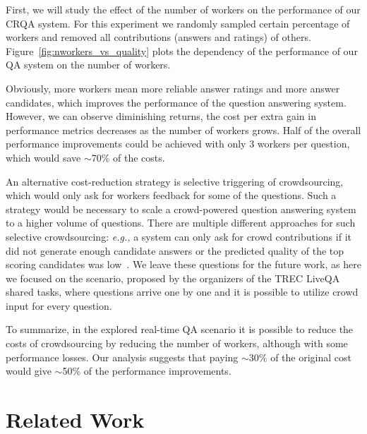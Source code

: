 \documentclass[letterpaper]{article}
\makeatletter
\newcommand{\eg}{\textit{e.g.,}\@\xspace}
\makeatother
\begin{document}
First, we will study the effect of the number of workers on the performance of our CRQA system.
For this experiment we randomly sampled certain percentage of workers and removed all contributions (answers and ratings) of others.
Figure~\ref{fig:nworkers_vs_quality} plots the dependency of the performance of our QA system on the number of workers.

Obviously, more workers mean more reliable answer ratings and more answer candidates, which improves the performance of the question answering system.
However, we can observe diminishing returns, the cost per extra gain in performance metrics decreases as the number of workers grows.
Half of the overall performance improvements could be achieved with only 3 workers per question, which would save $\sim$70\% of the costs.

An alternative cost-reduction strategy is selective triggering of crowdsourcing, which would only ask for workers feedback for some of the questions.
Such a strategy would be necessary to scale a crowd-powered question answering system to a higher volume of questions.
There are multiple different approaches for such selective crowdsourcing: \eg a system can only ask for crowd contributions if it did not generate enough candidate answers or the predicted quality of the top scoring candidates was low~\cite{carmel2010estimating,he2006query}.
We leave these questions for the future work, as here we focused on the scenario, proposed by the organizers of the TREC LiveQA shared tasks, where questions arrive one by one and it is possible to utilize crowd input for every question.

To summarize, in the explored real-time QA scenario it is possible to reduce the costs of crowdsourcing by reducing the number of workers, although with some performance losses.
Our analysis suggests that paying $\sim$30\% of the original cost would give $\sim$50\% of the performance improvements.

\section{Related Work}
\label{sec:related_work}
\end{document}
